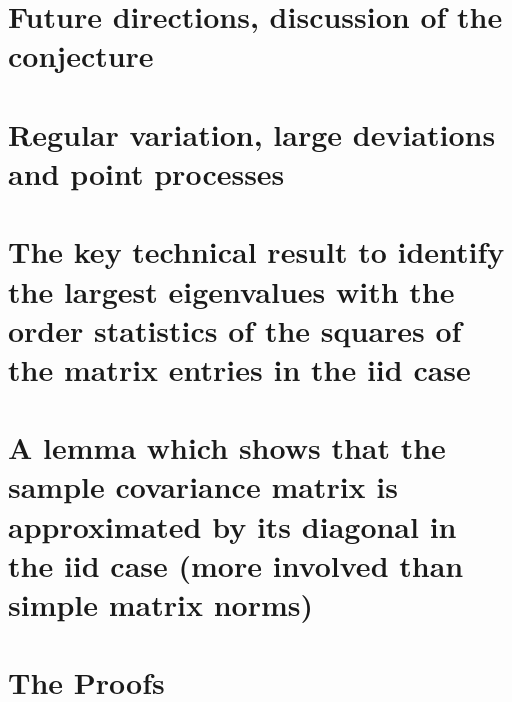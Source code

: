 \documentclass[11pt,reqno]{amsart}
\newcommand{\1}{\mathds{1}}
\newcommand{\0}{\boldsymbol{0}}
\newcommand{\4}{\mathchoice{\mskip1.5mu}{\mskip1.5mu}{}{}}
\newcommand{\5}{\mathchoice{\mskip-1.5mu}{\mskip-1.5mu}{}{}}
\newcommand{\2}{\penalty250\mskip\thickmuskip\mskip-\thinmuskip} %
\begin{document}
\section{Future directions, discussion of the conjecture}


\appendix 
\section{Regular variation, large deviations and point processes}
\section{The key technical result to identify the largest eigenvalues
  with the order statistics of the squares of the matrix entries in
  the iid case}
\section{A lemma which shows that the sample covariance matrix is
  approximated by its diagonal in the iid case (more involved than
  simple matrix norms)}
\section{The Proofs}
\end{document}

